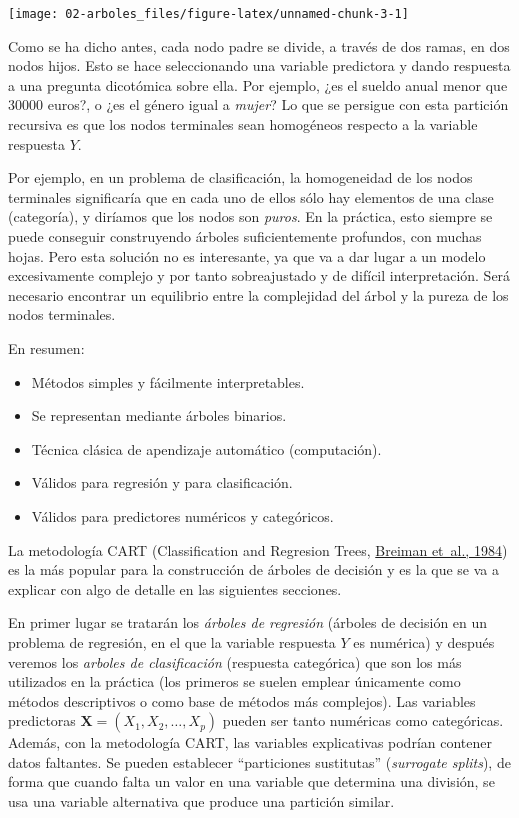 \documentclass[
  spanish,
]{book}
\theoremstyle{break}
\theoremstyle{definition}
\theoremstyle{definition}
\theoremstyle{definition}
\theoremstyle{definition}
\theoremstyle{remark}
\begin{document}
\begin{center}\texttt{[image: 02-arboles\_files/figure-latex/unnamed-chunk-3-1]} \end{center}

Como se ha dicho antes, cada nodo padre se divide, a través de dos ramas, en dos nodos hijos.
Esto se hace seleccionando una variable predictora y dando respuesta a una pregunta dicotómica sobre ella.
Por ejemplo, ¿es el sueldo anual menor que 30000 euros?, o ¿es el género igual a \emph{mujer}?
Lo que se persigue con esta partición recursiva es que los nodos terminales sean homogéneos respecto a la variable respuesta \(Y\).

Por ejemplo, en un problema de clasificación, la homogeneidad de los nodos terminales significaría que en cada uno de ellos sólo hay elementos de una clase (categoría), y diríamos que los nodos son \emph{puros}.
En la práctica, esto siempre se puede conseguir construyendo árboles suficientemente profundos, con muchas hojas.
Pero esta solución no es interesante, ya que va a dar lugar a un modelo excesivamente complejo y por tanto sobreajustado y de difícil interpretación.
Será necesario encontrar un equilibrio entre la complejidad del árbol y la pureza de los nodos terminales.

En resumen:

\begin{itemize}
\item
  Métodos simples y fácilmente interpretables.
\item
  Se representan mediante árboles binarios.
\item
  Técnica clásica de apendizaje automático (computación).
\item
  Válidos para regresión y para clasificación.
\item
  Válidos para predictores numéricos y categóricos.
\end{itemize}

La metodología CART (Classification and Regresion Trees, \protect\hyperlink{ref-breiman1984classification}{Breiman et~al., 1984}) es la más popular para la construcción de árboles de decisión y es la que se va a explicar con algo de detalle en las siguientes secciones.

En primer lugar se tratarán los \emph{árboles de regresión} (árboles de decisión en un problema de regresión, en el que la variable respuesta \(Y\) es numérica) y después veremos los \emph{arboles de clasificación} (respuesta categórica) que son los más utilizados en la práctica (los primeros se suelen emplear únicamente como métodos descriptivos o como base de métodos más complejos).
Las variables predictoras \(\mathbf{X}=(X_1, X_2, \ldots, X_p)\) pueden ser tanto numéricas como categóricas.
Además, con la metodología CART, las variables explicativas podrían contener datos faltantes.
Se pueden establecer ``particiones sustitutas'' (\emph{surrogate splits}), de forma que cuando falta un valor en una variable que determina una división, se usa una variable alternativa que produce una partición similar.
\end{document}
